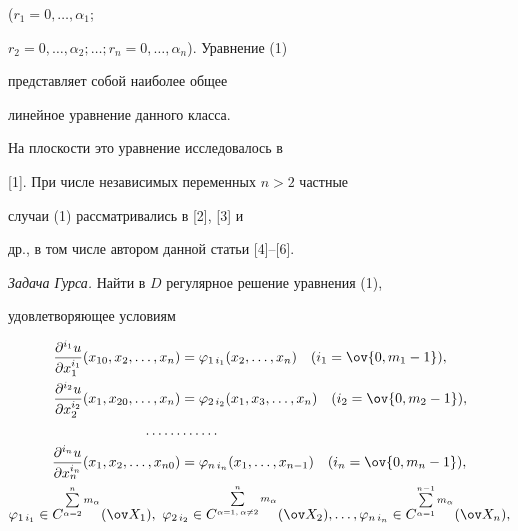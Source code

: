 ($r_1=0,\dotsc,\alpha_1$; 


$r_2=0,\dotsc,\alpha_2;\dotsc;r_n=0,\dotsc,\alpha_n$). Уравнение (1) 


представляет собой наиболее общее 


линейное уравнение данного класса. 


 


На плоскости это уравнение исследовалось в 


[1]. При числе независимых переменных $n>2$ частные 


случаи (1) рассматривались в [2], [3] и 


др., в том числе автором данной статьи [4]--[6]. 


\medskip 


 


{\it Задача Гурса.} Найти в $D$ регулярное решение уравнения (1), 


удовлетворяющее условиям 


\begin{gather} 


\begin{split} 


\frac{\partial^{i_1}u}{\partial x^{i_1}_1} 


(x_{10},x_2,\dotsc,x_n)&=\varphi_{1\,i_1}(x_2,\dotsc,x_n)\quad 


(i_1=\ov{0,m_1-1}),\\ 


% 


\frac{\partial^{i_2}u}{\partial x^{i_2}_2} 


(x_{1},x_{20},\dotsc,x_n)&=\varphi_{2\,i_2}(x_1,x_3,\dotsc,x_n)\quad 


(i_2=\ov{0,m_2-1}),\\


% 


\dotsc\dotsc&\dotsc\dotsc \\ 


% 


\frac{\partial^{i_n}u}{\partial x^{i_n}_n} 


(x_{1},x_2,\dotsc,x_{n0})&=\varphi_{n\,i_n}(x_1,\dotsc,x_{n-1})\quad 


(i_n=\ov{0,m_n-1}),


\end{split} 


\\ 


\varphi_{1\,i_1}\in C^{\sum\limits^n_{\alpha=2}m_\alpha} 


(\ov X_1),\ \varphi_{2\,i_2}\in 


C^{\sum\limits^n_{\alpha=1,\,\alpha\ne2}m_\alpha}(\ov X_2),\dotsc, 


\varphi_{n\,i_n}\in C^{\sum\limits^{n-1}_{\alpha=1}m_\alpha} 


(\ov X_n), \notag 


\end{gather} 



